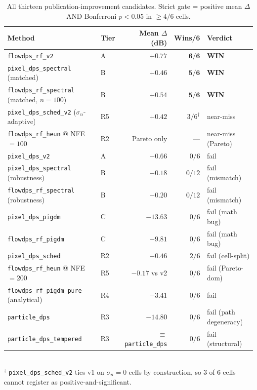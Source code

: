 \documentclass{article}
\begin{document}
\begin{table}[h]
  \centering
  \caption{All thirteen publication-improvement candidates. Strict
    gate = positive mean $\Delta$ AND Bonferroni $p<0.05$ in
    $\geq 4/6$ cells.}
  \label{tab:ablations_full}
  \small
  \begin{tabular}{llrrl}
    \toprule
    Method & Tier & Mean $\Delta$ (dB) & Wins/6 & Verdict \\
    \midrule
    \texttt{flowdps\_rf\_v2}                          & A & $\boldsymbol{+0.77}$ & $\boldsymbol{6/6}$ & \textbf{WIN} \\
    \texttt{pixel\_dps\_spectral} (matched)           & B & $\boldsymbol{+0.46}$ & $\boldsymbol{5/6}$ & \textbf{WIN} \\
    \texttt{flowdps\_rf\_spectral} (matched, $n{=}100$) & B & $\boldsymbol{+0.54}$ & $\boldsymbol{5/6}$ & \textbf{WIN} \\
    \midrule
    \texttt{pixel\_dps\_sched\_v2} ($\sigma_n$-adaptive) & R5 & $+0.42$ & $3/6^\dagger$ & near-miss \\
    \texttt{flowdps\_rf\_heun} @ NFE${=}100$           & R2 & Pareto only & --- & near-miss (Pareto) \\
    \midrule
    \texttt{pixel\_dps\_v2}                           & A & $-0.66$  & $0/6$ & fail \\
    \texttt{pixel\_dps\_spectral} (robustness)        & B & $-0.18$  & $0/12$ & fail (mismatch) \\
    \texttt{flowdps\_rf\_spectral} (robustness)       & B & $-0.20$  & $0/12$ & fail (mismatch) \\
    \texttt{pixel\_dps\_pigdm}                        & C & $-13.63$ & $0/6$ & fail (math bug) \\
    \texttt{flowdps\_rf\_pigdm}                       & C & $-9.81$  & $0/6$ & fail (math bug) \\
    \texttt{pixel\_dps\_sched}                        & R2 & $-0.46$  & $2/6$ & fail (cell-split) \\
    \texttt{flowdps\_rf\_heun} @ NFE${=}200$          & R5 & $-0.17$ vs v2 & $0/6$ & fail (Pareto-dom) \\
    \texttt{flowdps\_rf\_pigdm\_pure} (analytical)    & R4 & $-3.41$  & $0/6$ & fail \\
    \texttt{particle\_dps}                            & R3 & $-14.80$ & $0/6$ & fail (path degeneracy) \\
    \texttt{particle\_dps\_tempered}                  & R3 & $\equiv$ \texttt{particle\_dps} & $0/6$ & fail (structural) \\
    \bottomrule
  \end{tabular}
  \\[0.3em]
  \footnotesize $^\dagger$ \texttt{pixel\_dps\_sched\_v2} ties v1 on
  $\sigma_n{=}0$ cells by construction, so 3 of 6 cells cannot register
  as positive-and-significant.
\end{table}
\end{document}
